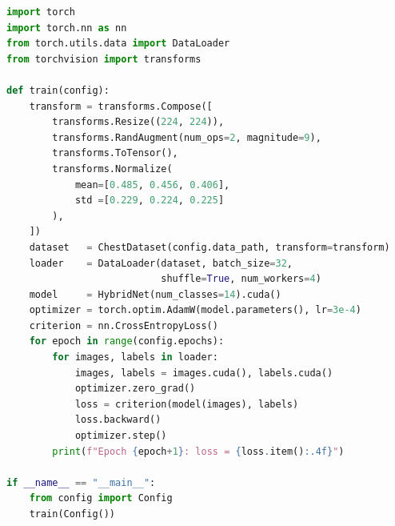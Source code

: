 \begin{lstlisting}[language=Python,
  caption={Модуль навчання моделі HybridNet (train.py)},
  label={lst:train}]
import torch
import torch.nn as nn
from torch.utils.data import DataLoader
from torchvision import transforms

def train(config):
    transform = transforms.Compose([
        transforms.Resize((224, 224)),
        transforms.RandAugment(num_ops=2, magnitude=9),
        transforms.ToTensor(),
        transforms.Normalize(
            mean=[0.485, 0.456, 0.406],
            std =[0.229, 0.224, 0.225]
        ),
    ])
    dataset   = ChestDataset(config.data_path, transform=transform)
    loader    = DataLoader(dataset, batch_size=32,
                           shuffle=True, num_workers=4)
    model     = HybridNet(num_classes=14).cuda()
    optimizer = torch.optim.AdamW(model.parameters(), lr=3e-4)
    criterion = nn.CrossEntropyLoss()
    for epoch in range(config.epochs):
        for images, labels in loader:
            images, labels = images.cuda(), labels.cuda()
            optimizer.zero_grad()
            loss = criterion(model(images), labels)
            loss.backward()
            optimizer.step()
        print(f"Epoch {epoch+1}: loss = {loss.item():.4f}")

if __name__ == "__main__":
    from config import Config
    train(Config())
\end{lstlisting}
